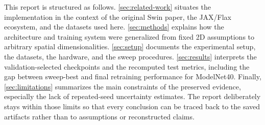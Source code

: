 This report is structured as follows. \autoref{sec:related-work} situates the implementation in the context of the original Swin paper, the JAX/Flax ecosystem, and the datasets used here. \autoref{sec:methods} explains how the architecture and training system were generalized from fixed 2D assumptions to arbitrary spatial dimensionalities. \autoref{sec:setup} documents the experimental setup, the datasets, the hardware, and the sweep procedures. \autoref{sec:results} interprets the validation-selected checkpoints and the recomputed test metrics, including the gap between sweep-best and final retraining performance for ModelNet40. Finally, \autoref{sec:limitations} summarizes the main constraints of the preserved evidence, especially the lack of repeated-seed uncertainty estimates. The report deliberately stays within those limits so that every conclusion can be traced back to the saved artifacts rather than to assumptions or reconstructed claims.
